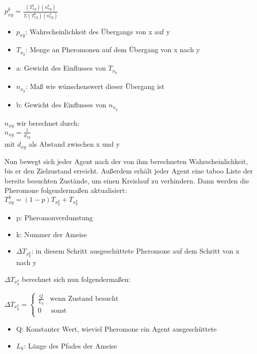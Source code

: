 \large$p_{xy}^k=\frac{(T_{xy}^a)(n_{xy}^b)}{\Sigma(T_{xy}^a)(n_{xy}^b) }$

\begin{itemize}
  \item $p_{xy}$: Wahrscheinlichkeit des Übergangs von x auf y
  \item $T_x_y$: Menge an Pheromonen auf dem Übergang von x nach y 
  \item a: Gewicht des Einflusses von $T_x_y$
  \item $n_x_y$: Maß wie wünschenswert dieser Übergang ist
  \item b: Gewicht des Einflusses von $n_x_y$
\end{itemize}

$n_{xy}$ wir berechnet durch:\\
$n_{xy}=\frac{1}{d_{xy}}$\\
mit $d_{xy}$ als Abstand zwischen x und y

Nun bewegt sich jeder Agent nach der von ihm berechneten Wahrscheinlichkeit, bis er den Zielzustand erreicht. Außerdem erhält jeder Agent eine taboo Liste der bereits besuchten Zustände, um einen Kreislauf zu verhindern. Dann werden die Pheromone folgendermaßen aktualisiert:\\
$T_{xy}^k=(1-p)T_x_y^k+$\Delta $T_x_y^k$
\begin{itemize}
  \item p: Pheromonverdunstung
  \item k: Nummer der Ameise
  \item $\Delta T_x_y^k$: in diesem Schritt ausgeschüttete Pheromone auf dem Schritt von x nach y
\end{itemize}
$\Delta T_x_y^k$ berechnet sich nun folgendermaßen:

$\Delta T_x_y^k = \left\{
\begin{array}{ll}
\frac{Q}{L_k} & \textrm{wenn Zustand besucht} \\
0 & \, \textrm{sonst} \\
\end{array}
\right. $
\begin{itemize}
    \item Q: Konstanter Wert, wieviel Pheromone ein Agent ausgeschüttete
    \item $L_k$: Länge des Pfades der Ameise
\end{itemize}


